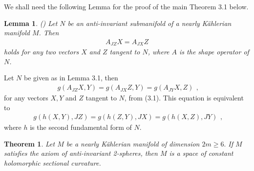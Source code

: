 \documentclass{amsart}
\newtheorem{theorem}{Theorem}[section]
\newtheorem*{theorem A}{Theorem A}
\newtheorem*{theorem B}{N\"olker's Theorem}
\newtheorem{lemma}{Lemma}[section]
\theoremstyle{remark}
\theoremstyle{remark}
\theoremstyle{definition}
\numberwithin{equation}{section}
\begin{document}
We shall need the following Lemma for the proof of the main Theorem
3.1 below.
\begin{lemma}(\cite{Ho}) Let $N$ be an anti-invariant submanifold of a nearly
K\"{a}hlerian manifold $M$. Then
\begin{equation}
\label{e1}
\begin{array}{c}
A_{JZ}X=A_{JX}Z
\end{array}
\end{equation}
holds for any two vectors $X$ and $Z$ tangent to $N$, where $A$ is
the shape operator of $N$.
\end{lemma}
Let $N$ be given as in Lemma 3.1, then
\begin{equation}
\label{e1}
\begin{array}{c}
g(A_{JZ}X,Y)=g(A_{JX}Z,Y)=g(A_{JY}X,Z)
\end{array},
\end{equation}
for any vectors $X,Y$ and $Z$ tangent to $N$, from (3.1). This
equation is equivalent to
\begin{equation}
\label{e1}
\begin{array}{c}
g(h(X,Y),JZ)=g(h(Z,Y),JX)=g(h(X,Z),JY)
\end{array},
\end{equation}
where $h$ is the second fundamental form of $N$.
\begin{theorem}
Let $M$ be a nearly K\"{a}hlerian manifold of dimension $2m\geq6.$
If $M$ satisfies the axiom of anti-invariant 2-spheres, then $M$ is
a space of constant holomorphic sectional curvature.
\end{theorem}
\end{document}
